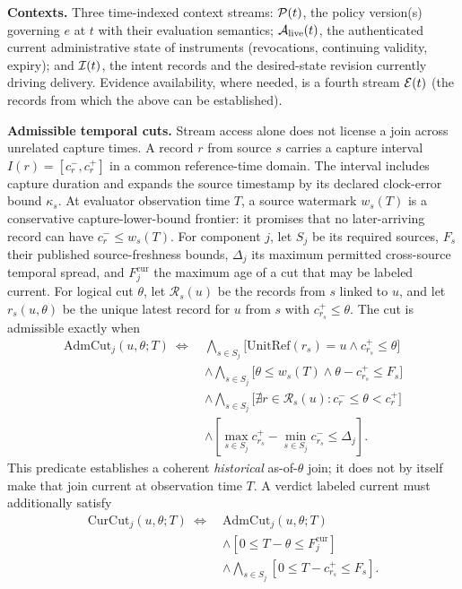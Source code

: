 \textbf{Contexts.} Three time-indexed context streams:
$\mathcal{P}(t)$, the policy version(s) governing $e$ at $t$ with their evaluation
semantics; $\mathcal{A}_{\mathrm{live}}(t)$, the authenticated current administrative
state of instruments (revocations, continuing validity, expiry); and $\mathcal{I}(t)$, the intent records and the
desired-state revision currently driving delivery. Evidence availability,
where needed, is a fourth stream $\mathcal{E}(t)$ (the records from which the above
can be established).

\textbf{Admissible temporal cuts.} Stream access alone does not license a
join across unrelated capture times. A record $r$ from source $s$ carries a
capture interval $I(r)=[c_r^-,c_r^+]$ in a common reference-time domain. The
interval includes capture duration and expands the source timestamp by its
declared clock-error bound $\kappa_s$. At evaluator observation time $T$, a
source watermark $w_s(T)$ is a conservative capture-lower-bound frontier: it
promises that no later-arriving record can have $c_r^-\leq w_s(T)$. For
component $j$, let $S_j$ be its
required sources, $F_s$ their published source-freshness bounds, $\Delta_j$ its
maximum permitted cross-source temporal spread, and $F_j^{\mathrm{cur}}$ the
maximum age of a cut that may be labeled current. For logical cut $\theta$, let
$\mathcal R_s(u)$ be the records from $s$ linked to $u$, and let
$r_s(u,\theta)$ be the unique latest record for $u$ from $s$ with
$c_{r_s}^+\leq\theta$. The cut is admissible exactly when
\[
\begin{aligned}
\mathrm{AdmCut}_j(u,\theta;T)\ \Longleftrightarrow\ {}
&\bigwedge_{s\in S_j}\bigl[
  \mathrm{UnitRef}(r_s)=u\land c_{r_s}^+\leq\theta\bigr]\\
&\land\bigwedge_{s\in S_j}\bigl[
  \theta\leq w_s(T)\land\theta-c_{r_s}^+\leq F_s\bigr]\\
&\land\bigwedge_{s\in S_j}\bigl[
  \nexists r\in\mathcal R_s(u):c_r^-\leq\theta<c_r^+\bigr]\\
&\land\left[\max_{s\in S_j}c_{r_s}^+
  -\min_{s\in S_j}c_{r_s}^-\leq\Delta_j\right].
\end{aligned}
\]
This predicate establishes a coherent \emph{historical} as-of-$\theta$ join;
it does not by itself make that join current at observation time $T$. A verdict
labeled current must additionally satisfy
\[
\begin{aligned}
\mathrm{CurCut}_j(u,\theta;T)\ \Longleftrightarrow\ {}
&\mathrm{AdmCut}_j(u,\theta;T)\\
&\land[0\leq T-\theta\leq F_j^{\mathrm{cur}}]\\
&\land\bigwedge_{s\in S_j}[0\leq T-c_{r_s}^+\leq F_s].
\end{aligned}
\]
